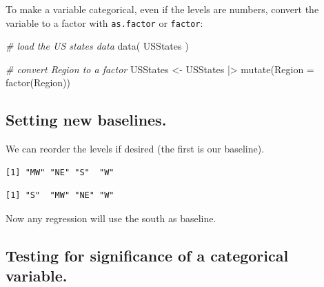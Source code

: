 \documentclass[
  letterpaper,
  DIV=11,
  numbers=noendperiod]{scrreprt}
\newenvironment{Shaded}{}{}
\newcommand{\AttributeTok}[1]{\textcolor[rgb]{0.49,0.56,0.16}{#1}}
\newcommand{\CommentTok}[1]{\textcolor[rgb]{0.38,0.63,0.69}{\textit{#1}}}
\newcommand{\FunctionTok}[1]{\textcolor[rgb]{0.02,0.16,0.49}{#1}}
\newcommand{\NormalTok}[1]{#1}
\newcommand{\OtherTok}[1]{\textcolor[rgb]{0.00,0.44,0.13}{#1}}
\newcommand{\SpecialCharTok}[1]{\textcolor[rgb]{0.25,0.44,0.63}{#1}}
\newcommand{\StringTok}[1]{\textcolor[rgb]{0.25,0.44,0.63}{#1}}
\begin{document}
To make a variable categorical, even if the levels are numbers, convert
the variable to a factor with \texttt{as.factor} or \texttt{factor}:

\begin{Shaded}
\begin{Highlighting}[]
\CommentTok{\# load the US states data}
\FunctionTok{data}\NormalTok{( USStates )}

\CommentTok{\# convert Region to a factor}
\NormalTok{USStates }\OtherTok{\textless{}{-}}\NormalTok{ USStates }\SpecialCharTok{|\textgreater{}} 
  \FunctionTok{mutate}\NormalTok{(}\AttributeTok{Region =} \FunctionTok{factor}\NormalTok{(Region))}
\end{Highlighting}
\end{Shaded}

\subsection{Setting new baselines.}\label{setting-new-baselines.}

We can reorder the levels if desired (the first is our baseline).

\begin{Shaded}
\end{Shaded}

\begin{verbatim}
[1] "MW" "NE" "S"  "W" 
\end{verbatim}

\begin{Shaded}
\end{Shaded}

\begin{verbatim}
[1] "S"  "MW" "NE" "W" 
\end{verbatim}

Now any regression will use the south as baseline.

\subsection{Testing for significance of a categorical
variable.}\label{testing-for-significance-of-a-categorical-variable.}
\end{document}
